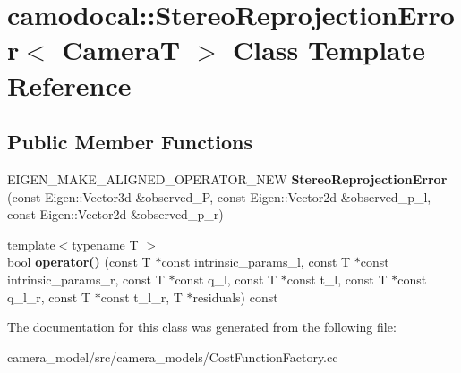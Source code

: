 \hypertarget{classcamodocal_1_1StereoReprojectionError}{}\section{camodocal\+:\+:Stereo\+Reprojection\+Error$<$ CameraT $>$ Class Template Reference}
\label{classcamodocal_1_1StereoReprojectionError}
\subsection*{Public Member Functions}
\begin{DoxyCompactItemize}
\item 
\mbox{\label{classcamodocal_1_1StereoReprojectionError_a9132e5728038e3df2055e7a017842d57}} 
E\+I\+G\+E\+N\+\_\+\+M\+A\+K\+E\+\_\+\+A\+L\+I\+G\+N\+E\+D\+\_\+\+O\+P\+E\+R\+A\+T\+O\+R\+\_\+\+N\+EW {\bfseries Stereo\+Reprojection\+Error} (const Eigen\+::\+Vector3d \&observed\+\_\+P, const Eigen\+::\+Vector2d \&observed\+\_\+p\+\_\+l, const Eigen\+::\+Vector2d \&observed\+\_\+p\+\_\+r)
\item 
\mbox{\label{classcamodocal_1_1StereoReprojectionError_abd172d356fdf3b096f492781e347102d}} 
{\footnotesize template$<$typename T $>$ }\\bool {\bfseries operator()} (const T $\ast$const intrinsic\+\_\+params\+\_\+l, const T $\ast$const intrinsic\+\_\+params\+\_\+r, const T $\ast$const q\+\_\+l, const T $\ast$const t\+\_\+l, const T $\ast$const q\+\_\+l\+\_\+r, const T $\ast$const t\+\_\+l\+\_\+r, T $\ast$residuals) const
\end{DoxyCompactItemize}


The documentation for this class was generated from the following file\+:\begin{DoxyCompactItemize}
\item 
camera\+\_\+model/src/camera\+\_\+models/Cost\+Function\+Factory.\+cc\end{DoxyCompactItemize}
